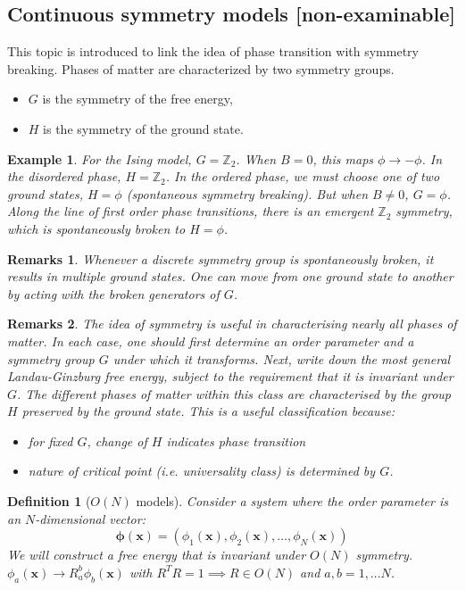 \documentclass[a4paper]{article}
\newtheorem{remarks}{Remarks}[section]
\newtheorem{eg}{Example}[section]
\theoremstyle{new}
\newtheorem{defi}{Definition}[section]
\begin{document}
\subsection{Continuous symmetry models [non-examinable]}
This topic is introduced to link the idea of phase transition with symmetry breaking. Phases of matter are characterized by two symmetry groups.
\begin{itemize}
    \item $G$ is the symmetry of the free energy,
    \item $H$ is the symmetry of the ground state.
\end{itemize}
\begin{eg}
For the Ising model, $G=\mathbb{Z}_2$. When $B=0$, this maps $\phi\rightarrow-\phi$. In the disordered phase, $H=\mathbb{Z}_2$. In the ordered phase, we must choose one of two ground states, $H=\phi$ (spontaneous symmetry breaking). But when $B\neq 0$, $G=\phi$. Along the line of first order phase transitions, there is an emergent $\mathbb{Z}_2$ symmetry, which is spontaneously broken to $H=\phi$.
\end{eg}
\begin{remarks}
Whenever a discrete symmetry group is spontaneously broken, it results in multiple ground states. One can move from one ground state to another by acting with the broken generators of $G$.
\end{remarks}
\begin{remarks}
The idea of symmetry is useful in characterising nearly all phases of matter. In each case, one should first determine an order parameter and a symmetry group $G$ under which it transforms. Next, write down the most general Landau-Ginzburg free energy, subject to the requirement that it is invariant under $G$. The different phases of matter within this class are characterised by the group $H$ preserved by the ground state. This is a useful classification because:
\begin{itemize}
    \item for fixed $G$, change of $H$ indicates phase transition
    \item nature of critical point (i.e. universality class) is determined by $G$.
\end{itemize}
\end{remarks}
\begin{defi}[$O(N)$ models]
Consider a system where the order parameter is an $N$-dimensional vector:
$$\boldsymbol{\phi}(\mathbf{x})=(\phi_1(\mathbf{x}),\phi_2(\mathbf{x}),\dots,\phi_N(\mathbf{x}))$$
We will construct a free energy that is invariant under $O(N)$ symmetry. $\phi_a(\mathbf{x})\rightarrow R^b_a\phi_b(\mathbf{x})$ with $R^TR=1\implies R\in O(N)$ and $a,b=1,\dots N$.
\end{defi}
\end{document}
